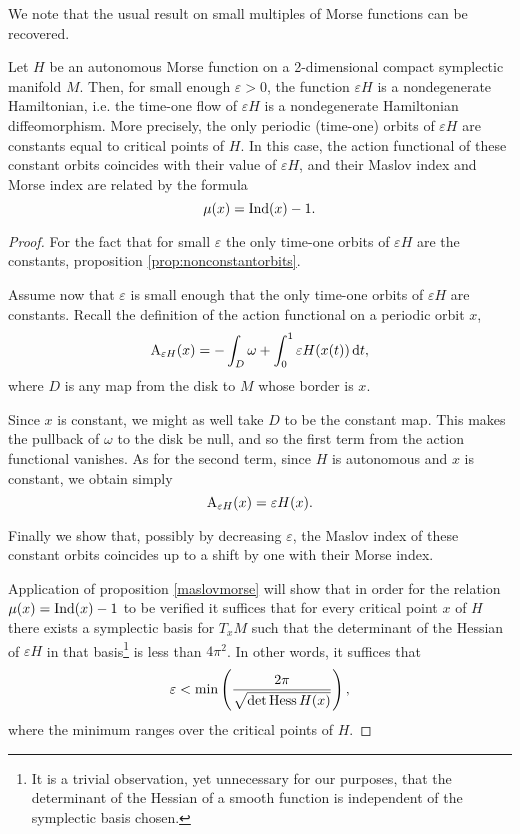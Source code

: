 We note that the usual result on small multiples of Morse functions can be recovered.

\begin{corollary}\label{cor:orbitsepsH}
Let $H$ be an autonomous Morse function on a 2-dimensional compact symplectic manifold $M$. Then, for small enough $\varepsilon > 0$, the function $\varepsilon H$ is a nondegenerate Hamiltonian, i.e. the time-one flow of $\varepsilon H$ is a nondegenerate Hamiltonian diffeomorphism. More precisely, the only periodic (time-one) orbits of $\varepsilon H$ are constants equal to critical points of $H$. In this case, the action functional of these constant orbits coincides with their value of $\varepsilon H$, and their Maslov index and Morse index are related by the formula
\begin{equation}
\mu(x) = \Ind(x) - 1.
\end{equation}
\end{corollary}

\begin{proof}
For the fact that for small $\varepsilon$ the only time-one orbits of $\varepsilon H$ are the constants, proposition \ref{prop:nonconstantorbits}.

Assume now that $\varepsilon$ is small enough that the only time-one orbits of $\varepsilon H$ are constants. Recall the definition of the action functional on a periodic orbit $x$,
\begin{equation}
\AA_{\varepsilon H}(x) = - \int_D \omega + \int_0^1 \varepsilon H(x(t)) \dl t,
\end{equation}
where $D$ is any map from the disk to $M$ whose border is $x$.

Since $x$ is constant, we might as well take $D$ to be the constant map. This makes the pullback of $\omega$ to the disk be null, and so the first term from the action functional vanishes. As for the second term, since $H$ is autonomous and $x$ is constant, we obtain simply
\begin{equation}
\AA_{\varepsilon H}(x) = \varepsilon H(x).
\end{equation}

Finally we show that, possibly by decreasing $\varepsilon$, the Maslov index of these constant orbits coincides up to a shift by one with their Morse index.

Application of proposition \ref{maslovmorse} will show that in order for the relation $\mu(x) = \Ind(x) - 1$ to be verified it suffices that for every critical point $x$ of $H$ there exists a symplectic basis for $T_x M$ such that the determinant of the Hessian of $\varepsilon H$ in that basis\footnote{It is a trivial observation, yet unnecessary for our purposes, that the determinant of the Hessian of a smooth function is independent of the symplectic basis chosen.} is less than $4 \pi^2$. In other words, it suffices that
\begin{equation}
\varepsilon < \min \left( \frac{2\pi}{\sqrt{\det \hessian H(x)}}\right),
\end{equation}
where the minimum ranges over the critical points of $H$.
\end{proof}

